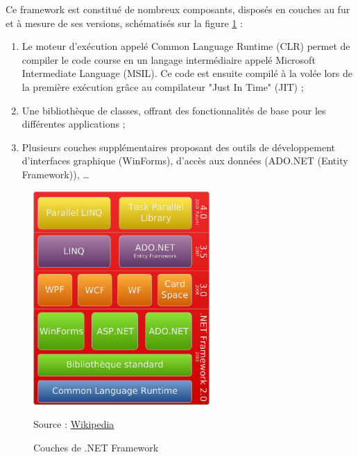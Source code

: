 Ce framework est constitué de nombreux composants, disposés en couches au fur et à mesure de ses versions, schématisés sur la figure \ref{NET_Framework} :
\begin{enumerate}
	\item Le moteur d'exécution appelé Common Language Runtime (CLR) permet de compiler le code course en un langage intermédiaire appelé Microsoft Intermediate Language (MSIL).
Ce code est ensuite compilé à la volée lors de la première exécution grâce au compilateur "Just In Time" (JIT) ;
	\item Une bibliothèque de classes, offrant des fonctionnalités de base pour les différentes applications ;
	\item Plusieurs couches supplémentaires proposant des outils de développement d'interfaces graphique (WinForms), d'accès aux données (ADO.NET (Entity Framework)), \ldots
\end{enumerate}
\begin{figure}[!h]
	\center
	\includegraphics[width=0.6\textwidth]{img/NET_Framework.png}
	\caption{Couches de .NET Framework}
	Source : \href{http://fr.wikipedia.org/wiki/Framework\_.NET}{Wikipedia}
	\label{NET_Framework}
\end{figure}


